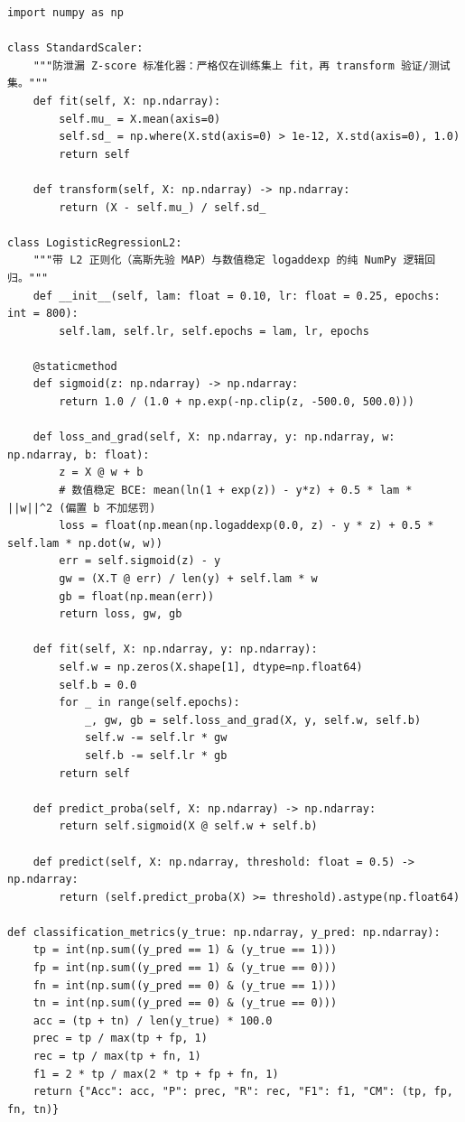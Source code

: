 \begin{lstlisting}[caption={纯 NumPy 端到端防泄漏逻辑回归流水线与有限差分梯度校验}, label={lst:ch6-pipeline}]
import numpy as np

class StandardScaler:
    """防泄漏 Z-score 标准化器：严格仅在训练集上 fit，再 transform 验证/测试集。"""
    def fit(self, X: np.ndarray):
        self.mu_ = X.mean(axis=0)
        self.sd_ = np.where(X.std(axis=0) > 1e-12, X.std(axis=0), 1.0)
        return self

    def transform(self, X: np.ndarray) -> np.ndarray:
        return (X - self.mu_) / self.sd_

class LogisticRegressionL2:
    """带 L2 正则化（高斯先验 MAP）与数值稳定 logaddexp 的纯 NumPy 逻辑回归。"""
    def __init__(self, lam: float = 0.10, lr: float = 0.25, epochs: int = 800):
        self.lam, self.lr, self.epochs = lam, lr, epochs

    @staticmethod
    def sigmoid(z: np.ndarray) -> np.ndarray:
        return 1.0 / (1.0 + np.exp(-np.clip(z, -500.0, 500.0)))

    def loss_and_grad(self, X: np.ndarray, y: np.ndarray, w: np.ndarray, b: float):
        z = X @ w + b
        # 数值稳定 BCE: mean(ln(1 + exp(z)) - y*z) + 0.5 * lam * ||w||^2 (偏置 b 不加惩罚)
        loss = float(np.mean(np.logaddexp(0.0, z) - y * z) + 0.5 * self.lam * np.dot(w, w))
        err = self.sigmoid(z) - y
        gw = (X.T @ err) / len(y) + self.lam * w
        gb = float(np.mean(err))
        return loss, gw, gb

    def fit(self, X: np.ndarray, y: np.ndarray):
        self.w = np.zeros(X.shape[1], dtype=np.float64)
        self.b = 0.0
        for _ in range(self.epochs):
            _, gw, gb = self.loss_and_grad(X, y, self.w, self.b)
            self.w -= self.lr * gw
            self.b -= self.lr * gb
        return self

    def predict_proba(self, X: np.ndarray) -> np.ndarray:
        return self.sigmoid(X @ self.w + self.b)

    def predict(self, X: np.ndarray, threshold: float = 0.5) -> np.ndarray:
        return (self.predict_proba(X) >= threshold).astype(np.float64)

def classification_metrics(y_true: np.ndarray, y_pred: np.ndarray):
    tp = int(np.sum((y_pred == 1) & (y_true == 1)))
    fp = int(np.sum((y_pred == 1) & (y_true == 0)))
    fn = int(np.sum((y_pred == 0) & (y_true == 1)))
    tn = int(np.sum((y_pred == 0) & (y_true == 0)))
    acc = (tp + tn) / len(y_true) * 100.0
    prec = tp / max(tp + fp, 1)
    rec = tp / max(tp + fn, 1)
    f1 = 2 * tp / max(2 * tp + fp + fn, 1)
    return {"Acc": acc, "P": prec, "R": rec, "F1": f1, "CM": (tp, fp, fn, tn)}


\end{lstlisting}
